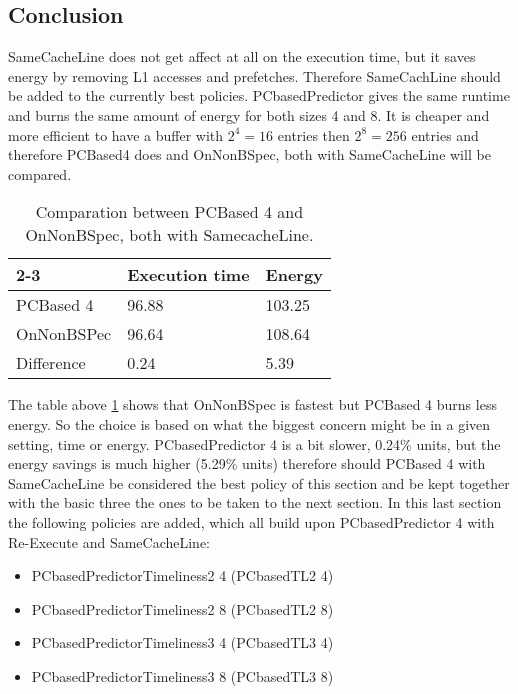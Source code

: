 \subsection{Conclusion}
SameCacheLine does not get affect at all on the execution time, but it saves energy
by removing L1 accesses and prefetches. Therefore SameCachLine should be added
to the currently best policies. PCbasedPredictor gives the same runtime and burns
the same amount of energy for both sizes 4 and 8. It is cheaper and more efficient
to have a buffer with $2^4=16$ entries then $2^8=256$ entries and therefore PCBased4
does and OnNonBSpec, both with SameCacheLine will be compared.

    \begin{table}[H]
\centering

\begin{tabular}{ |l|l|l| }
\cline{2-3}
\multicolumn{1}{ c| }{} 
& Execution time & Energy  \\  \hline
PCBased 4& 96.88 & 103.25  \\  \hline
OnNonBSPec & 96.64 & 108.64  \\  \hline
Difference & 0.24 & 5.39  \\  \hline
\end{tabular}
\caption{Comparation between PCBased 4 and OnNonBSpec, both with SamecacheLine. }
\label{quickcompPC4vsONBS}
\end{table}
The table above \ref{quickcompPC4vsONBS} shows that OnNonBSpec is fastest but PCBased 4 burns
less energy. So the choice is based on what the biggest concern might be in a given setting, time or energy. PCbasedPredictor 4 is a bit slower, 0.24\% units, but the energy
savings is much higher (5.29\% units) therefore should PCBased 4 with SameCacheLine be considered the best policy of this section and be kept together with the basic three
the ones to be taken to the next section.
In this last section the following policies are added, which all build upon PCbasedPredictor 4 with Re-Execute and SameCacheLine:
\begin{itemize}
    \item PCbasedPredictorTimeliness2 4 (PCbasedTL2 4)
    \item PCbasedPredictorTimeliness2 8 (PCbasedTL2 8)
    \item PCbasedPredictorTimeliness3 4 (PCbasedTL3 4)
    \item PCbasedPredictorTimeliness3 8 (PCbasedTL3 8)
\end{itemize}
\resExtime

